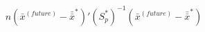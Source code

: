 

\[
n(\bar{x}^{\scriptscriptstyle{(future)}} - \bar{\bar{x}}^{*})'(S_{p}^{*})^{-1}(\bar{x}^{\scriptscriptstyle{(future)}} - \bar{\bar{x}}^{*})
\]


